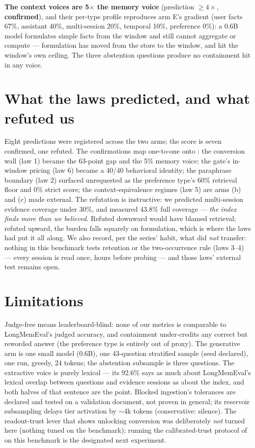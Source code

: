 \documentclass[11pt]{article}
\begin{document}
\textbf{The context voices are 5$\times$ the memory voice} (prediction $\geq 4\times$, \textbf{confirmed}), and their per-type profile reproduces arm E's gradient (user facts 67\%, assistant 40\%, multi-session 20\%, temporal 10\%, preference 0\%): a 0.6B model formulates simple facts from the window and still cannot aggregate or compute --- formulation has moved from the store to the window, and hit the window's own ceiling. The three abstention questions produce no containment hit in any voice.

\section{What the laws predicted, and what refuted us}\label{sec:laws}

Eight predictions were registered across the two arms; the score is seven confirmed, one refuted.
The confirmations map one-to-one onto \cite{behavior}: the conversion wall (law 1) became the 63-point gap and the 5\% memory voice; the gate's in-window pricing (law 6) became a 40/40 behavioral identity; the paraphrase boundary (law 2) surfaced unrequested as the preference type's 60\% retrieval floor and 0\% strict score; the context-equivalence regimes (law 5) are arms (b) and (c) made external. The refutation is instructive: we predicted multi-session evidence coverage under 30\%, and measured 43.8\% full coverage --- \emph{the index finds more than we believed}. Refuted downward would have blamed retrieval; refuted upward, the burden falls squarely on formulation, which is where the laws had put it all along. We also record, per the series' habit, what did \emph{not} transfer: nothing in this benchmark tests retention or the two-occurrence rule (laws 3--4) --- every session is read once, hours before probing --- and those laws' external test remains open.

\section{Limitations}

Judge-free means leaderboard-blind: none of our metrics is comparable to LongMemEval's judged accuracy, and containment under-credits any correct but reworded answer (the preference type is entirely out of proxy). The generative arm is one small model (0.6B), one 43-question stratified sample (seed declared), one run, greedy, 24 tokens; the abstention subsample is three questions. The extractive voice is purely lexical --- its 92.6\% says as much about LongMemEval's lexical overlap between questions and evidence sessions as about the index, and both halves of that sentence are the point. Blocked ingestion's tolerances are declared and tested on a validation document, not proven in general; its reservoir subsampling delays tier activation by $\sim$4k tokens (conservative: silence). The readout-trust lever that \cite{behavior} shows unlocking conversion was deliberately \emph{not} turned here (nothing tuned on the benchmark); running the calibrated-trust protocol of \cite{drafter} on this benchmark is the designated next experiment.
\end{document}
